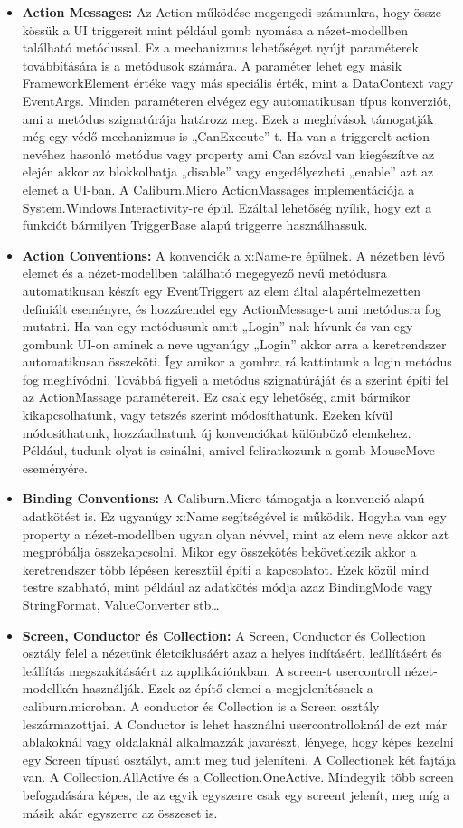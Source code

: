 \documentclass[
]{thesis-ekf}
\theoremstyle{definition}
\theoremstyle{remark}
\begin{document}
\begin{itemize}[leftmargin=*]
\item \textbf{Action Messages: }Az Action működése megengedi számunkra, hogy össze kössük a UI triggereit mint például gomb nyomása a nézet-modellben található metódussal. Ez a mechanizmus lehetőséget nyújt paraméterek továbbítására is a metódusok számára. A paraméter lehet egy másik FrameworkElement értéke vagy más speciális érték, mint a DataContext vagy EventArgs. Minden paraméteren elvégez egy automatikusan típus konverziót, ami a metódus szignatúrája határozz meg. Ezek a meghívások támogatják még egy védő mechanizmus is „CanExecute”-t. Ha van a triggerelt action nevéhez hasonló metódus vagy property ami Can szóval van kiegészítve az elején akkor az blokkolhatja „disable” vagy engedélyezheti „enable” azt az elemet a UI-ban. A Caliburn.Micro ActionMassages implementációja a System.Windows.Interactivity-re épül. Ezáltal lehetőség nyílik, hogy ezt a funkciót bármilyen TriggerBase alapú triggerre használhassuk.	
\item \textbf{Action Conventions: }A konvenciók a x:Name-re épülnek. A nézetben lévő elemet és a nézet-modellben található megegyező nevű metódusra automatikusan készít egy EventTriggert az elem által alapértelmezetten definiált eseményre, és hozzárendel egy ActionMessage-t ami metódusra fog mutatni. Ha van egy metódusunk amit „Login”-nak hívunk és van egy gombunk UI-on aminek a neve ugyanúgy „Login” akkor arra a keretrendszer automatikusan összeköti. Így amikor a gombra rá kattintunk a login metódus fog meghívódni. Továbbá figyeli a metódus szignatúráját és a szerint építi fel az ActionMassage paramétereit. Ez csak egy lehetőség, amit bármikor kikapcsolhatunk, vagy tetszés szerint módosíthatunk. Ezeken kívül módosíthatunk, hozzáadhatunk új konvenciókat különböző elemkehez. Például, tudunk olyat is csinálni, amivel feliratkozunk a gomb MouseMove eseményére.  
\item \textbf{Binding Conventions: }A Caliburn.Micro támogatja a konvenció-alapú adatkötést is. Ez ugyanúgy x:Name segítségével is működik. Hogyha van egy property a nézet-modellben ugyan olyan névvel, mint az elem neve akkor azt megpróbálja összekapcsolni. Mikor egy összekötés bekövetkezik akkor a keretrendszer több lépésen keresztül építi a kapcsolatot. Ezek közül mind testre szabható, mint például az adatkötés módja azaz BindingMode vagy StringFormat, ValueConverter stb\dots 	
\item \textbf{Screen, Conductor és Collection: }A Screen, Conductor és Collection osztály felel a nézetünk életciklusáért azaz a helyes indításért, leállításért és leállítás megszakításáért az applikációnkban. A screen-t usercontroll nézet-modellkén használják. Ezek az építő elemei a megjelenítésnek a caliburn.microban. A conductor és Collection is a Screen osztály leszármazottjai. A Conductor is lehet használni usercontrolloknál de ezt már ablakoknál vagy oldalaknál alkalmazzák javarészt, lényege, hogy képes kezelni egy Screen típusú osztályt, amit meg tud jeleníteni. A Collectionek két fajtája van.  A Collection.AllActive és a Collection.OneActive. Mindegyik több screen befogadására képes, de az egyik egyszerre csak egy screent jelenít, meg míg a másik akár egyszerre az összeset is.

\end{itemize}
\end{document}
